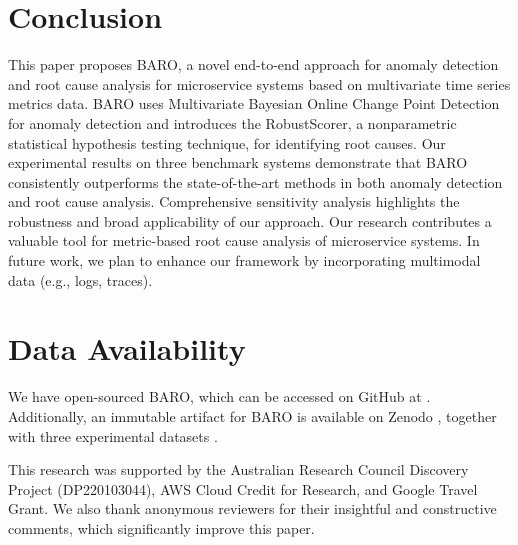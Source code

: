 \documentclass[acmsmall]{acmart}
\begin{document}
\label{sec:results}


\label{sec:discussion}


\section{Conclusion}
\label{sec:conclusion}

This paper proposes BARO, a novel end-to-end approach for anomaly detection and root cause analysis for microservice systems based on multivariate time series metrics data. BARO uses Multivariate Bayesian Online Change Point Detection for anomaly detection and introduces the RobustScorer, a nonparametric statistical hypothesis testing technique, for identifying root causes. Our experimental results on three benchmark systems demonstrate that BARO consistently outperforms the state-of-the-art methods in both anomaly detection and root cause analysis. Comprehensive sensitivity analysis highlights the robustness and broad applicability of our approach. Our research contributes a valuable tool for metric-based root cause analysis of microservice systems. 
In future work, we plan to enhance our framework by incorporating multimodal data (e.g., logs, traces). 

\section{Data Availability}
We have open-sourced BARO, which can be accessed on GitHub at \cite{barogithub}. Additionally, an immutable artifact for BARO is available on Zenodo \cite{barogithubzenodo}, together with three experimental datasets \cite{barodatasets}.




\begin{acks}
This research was supported by the Australian Research Council Discovery Project (DP220103044), AWS Cloud Credit for Research, and Google Travel Grant. We also thank anonymous reviewers for their insightful and constructive comments, which significantly improve this paper. 
\end{acks}



\end{document}
